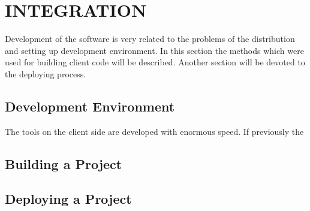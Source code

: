 \section{INTEGRATION}

Development of the software is very related to the problems of the distribution and
setting up development environment. In this section the methods which were used for
building client code will be described. Another section will be devoted to the
deploying process.

\subsection{Development Environment}

The tools on the client side are developed with enormous speed. If previously the

\subsection{Building a Project}
\subsection{Deploying a Project}

